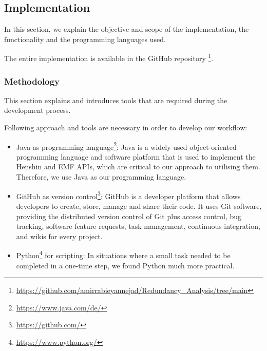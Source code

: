 \subsection{Implementation}\label{redundancy_implementation}
In this section, we explain the objective and scope of the implementation, the functionality and the programming languages used.

The entire implementation is available in the GitHub repository \footnote{\href{https://github.com/amirrabieyannejad/Redundancy_Analysis/tree/main}{https://github.com/amirrabieyannejad/Redundancy\_Analysis/tree/main}}.
\subsubsection*{Methodology}
This section explains and introduces tools that are required during the development process.

Following approach and tools are necessary in order to develop our workflow:
\begin{itemize}	
	\item Java as programming language\footnote{\href{https://www.java.com/de/}{https://www.java.com/de/}}: Java is a widely used object-oriented programming language and software platform that is used to implement the Henshin and EMF APIs, which are critical to our approach to utilising them. Therefore, we use Java as our programming language.
	
	\item GitHub as version control\footnote{\href{https://github.com/}{https://github.com/}}: GitHub is a developer platform that allows developers to create, store, manage and share their code. It uses Git software, providing the distributed version control of Git plus access control, bug tracking, software feature requests, task management, continuous integration, and wikis for every project.
	
	\item Python\footnote{\href{https://www.python.org/}{https://www.python.org/}} for scripting: In situations where a small task needed to be completed in a one-time step, we found Python much more practical.
\end{itemize} 

